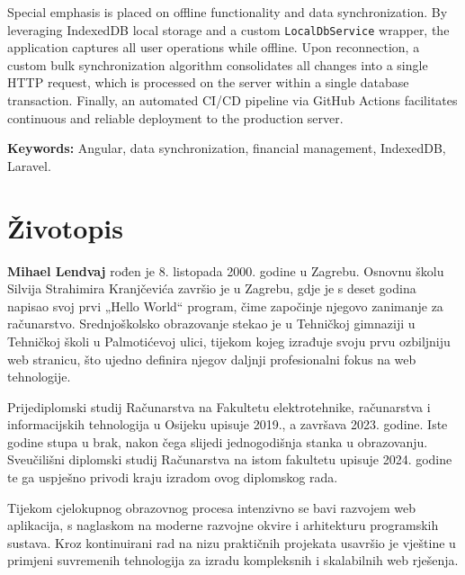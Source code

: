 \documentclass[a4paper,12pt,oneside]{article}
\begin{document}
	Special emphasis is placed on offline functionality and data synchronization. By leveraging IndexedDB local storage and a custom \texttt{LocalDbService} wrapper, the application captures all user operations while offline. Upon reconnection, a custom bulk synchronization algorithm consolidates all changes into a single HTTP request, which is processed on the server within a single database transaction. Finally, an automated CI/CD pipeline via GitHub Actions facilitates continuous and reliable deployment to the production server.
	
	\bigskip
	\noindent\textbf{Keywords:} Angular, data synchronization, financial management, IndexedDB, Laravel.
	
	
	\newpage
	\section*{Životopis}
	
	\noindent
	\textbf{Mihael Lendvaj} rođen je 8. listopada 2000. godine u Zagrebu. Osnovnu školu Silvija Strahimira Kranjčevića završio je u Zagrebu, gdje je s deset godina napisao svoj prvi „Hello World“ program, čime započinje njegovo zanimanje za računarstvo. Srednjoškolsko obrazovanje stekao je u Tehničkoj gimnaziji u Tehničkoj školi u Palmotićevoj ulici, tijekom kojeg izrađuje svoju prvu ozbiljniju web stranicu, što ujedno definira njegov daljnji profesionalni fokus na web tehnologije.
	
	\vspace{0.3cm}
	
	\noindent
	Prijediplomski studij Računarstva na Fakultetu elektrotehnike, računarstva i informacijskih tehnologija u Osijeku upisuje 2019., a završava 2023. godine. Iste godine stupa u brak, nakon čega slijedi jednogodišnja stanka u obrazovanju. Sveučilišni diplomski studij Računarstva na istom fakultetu upisuje 2024. godine te ga uspješno privodi kraju izradom ovog diplomskog rada.
	
	\vspace{0.3cm}
	
	\noindent
	Tijekom cjelokupnog obrazovnog procesa intenzivno se bavi razvojem web aplikacija, s naglaskom na moderne razvojne okvire i arhitekturu programskih sustava. Kroz kontinuirani rad na nizu praktičnih projekata usavršio je vještine u primjeni suvremenih tehnologija za izradu kompleksnih i skalabilnih web rješenja.
	
	\vspace{2.5cm} %
	
\end{document}
